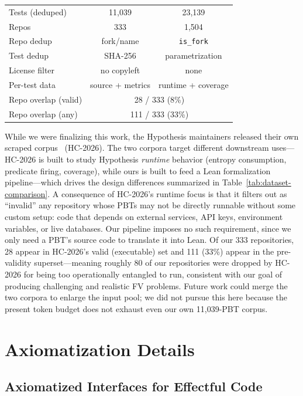 \begin{table}[t]
\begin{minipage}[t]{0.62\textwidth}
\begin{tabular}{@{}l c c@{}}
    Tests (deduped)  & 11{,}039           & 23{,}139 \\
    Repos            & 333                & 1{,}504 \\
    Repo dedup       & fork/name          & \texttt{is\_fork} \\
    Test dedup       & SHA-256            & parametrization \\
    License filter   & no copyleft        & none \\
    Per-test data    & source + metrics   & runtime + coverage \\
    \midrule
    Repo overlap (valid)  & \multicolumn{2}{c}{28 / 333 \enskip(8\%)} \\
    Repo overlap (any)    & \multicolumn{2}{c}{111 / 333 \enskip(33\%)} \\
    \bottomrule
  \end{tabular}
\end{minipage}
\end{table}

While we were finalizing this work, the Hypothesis maintainers released their own scraped corpus~\cite{devoe2026hypothesis} (HC-2026).
The two corpora target different downstream uses---HC-2026 is built to study Hypothesis \emph{runtime} behavior (entropy consumption, predicate firing, coverage), while ours is built to feed a Lean formalization pipeline---which drives the design differences summarized in Table~\ref{tab:dataset-comparison}.
A consequence of HC-2026's runtime focus is that it filters out as ``invalid'' any repository whose PBTs may not be directly runnable without some custom setup: code that depends on external services, API keys, environment variables, or live databases. Our pipeline imposes no such requirement, since we only need a PBT's source code to translate it into Lean. Of our 333 repositories, 28 appear in HC-2026's valid (executable) set and 111 (33\%) appear in the pre-validity superset---meaning roughly 80 of our repositories were dropped by HC-2026 for being too operationally entangled to run, consistent with our goal of producing challenging and realistic FV problems.
Future work could merge the two corpora to enlarge the input pool; we did not pursue this here because the present token budget does not exhaust even our own 11{,}039-PBT corpus.

\section{Axiomatization Details}
\subsection{Axiomatized Interfaces for Effectful Code}
\label{sec:threats-axioms}

